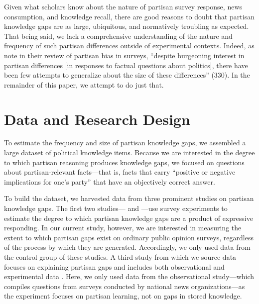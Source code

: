 \documentclass[12pt, letterpaper]{article}
\begin{document}
Given what scholars know about the nature of partisan survey response, news consumption, and knowledge recall, there are good reasons to doubt that partisan knowledge gaps are as large, ubiquitous, and normatively troubling as expected. That being said, we lack a comprehensive understanding of the nature and frequency of such partisan differences outside of experimental contexts. Indeed, as \citet{bullocklenz_2019} note in their review of partisan bias in surveys, ``despite burgeoning interest in partisan differences [in responses to factual questions about politics], there have been few attempts to generalize about the size of these differences'' (330).  In the remainder of this paper, we attempt to do just that.

\section*{Data and Research Design}

To estimate the frequency and size of partisan knowledge gaps, we assembled a large dataset of political knowledge items. Because we are interested in the degree to which partisan reasoning produces knowledge gaps, we focused on questions about partisan-relevant facts---that is, facts that carry ``positive or negative implications for one's party'' \citep[][673]{jerit2012partisan} that have an objectively correct answer.

To build the dataset, we harvested data from three prominent studies on partisan knowledge gaps. The first two studies---\citet{bullocketal_2015} and \citet{prior2015you}---use survey experiments to estimate the degree to which partisan knowledge gaps are a product of expressive responding. In our current study, however, we are interested in measuring the extent to which partisan gaps exist on ordinary public opinion surveys, regardless of the process by which they are generated. Accordingly, we only used data from the control group of these studies. A third study from which we source data focuses on explaining partisan gaps and includes both observational and experimental data \citep{jerit2012partisan}. Here, we only used data from the observational study---which compiles questions from surveys conducted by national news organizations---as the experiment focuses on partisan learning, not on gaps in stored knowledge. 
\end{document}
